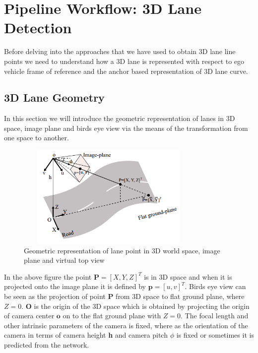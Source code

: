         
        \section{Pipeline Workflow: 3D Lane Detection }
        Before delving into the approaches that we have used to obtain 3D lane line points we need to understand how a 3D lane is represented with respect to ego vehicle frame of reference and the anchor based representation of 3D lane curve.  
        
        \subsection{3D Lane Geometry}
        In this section we will introduce the geometric representation of lanes in 3D space, image plane and birds eye view via the means of the transformation from one space to another. 
        
         \begin{figure}[h]
    \centering
    \includegraphics[width=9cm, height=5cm]{images/3d_lane_geometry.png}
    \caption{Geometric representation of lane point in 3D world space, image plane and virtual top view \cite{DBLP:journals/corr/abs-2112-15351}}
    \end{figure}
    
    In the above figure the point $\textbf{P} =[X, Y, Z]^{T}$ is in 3D space and when it is projected onto the image plane it is defined by $\textbf{p} = [u, v]^{T}$. Birds eye view can be seen as the projection of point $\textbf{P}$ from 3D space to flat ground plane, where $Z=0$. $\textbf{O}$ is the origin of the 3D space which is obtained by projecting the origin of camera center $\textbf{o}$ on to the flat ground plane with $Z = 0$. The focal length and other intrinsic parameters of the camera is fixed, where as the orientation of the camera in terms of camera height \textbf{h}  and camera pitch \textbf{$\phi$} is fixed or sometimes it is predicted from the network. 
    

